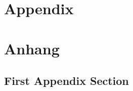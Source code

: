
{\chapter{Appendix}}    %
{\chapter{Anhang}}      %
\label{chap:appendix}


\section{First Appendix Section}
\label{sec:appendix:FirstSection}
		
\setcounter{figure}{0}

